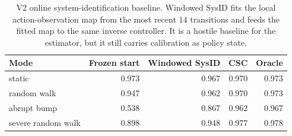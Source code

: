 \begin{table}[t]
\caption{V2 online system-identification baseline. Windowed SysID fits the local action-observation map from the most recent 14 transitions and feeds the fitted map to the same inverse controller. It is a hostile baseline for the estimator, but it still carries calibration as policy state.}
\label{tab:windowed-sysid}
\centering
\begin{tabular}{lrrrr}
\toprule
Mode & Frozen start & Windowed SysID & CSC & Oracle \\
\midrule
static & 0.973 & 0.967 & 0.970 & 0.973 \\
random walk & 0.947 & 0.962 & 0.970 & 0.973 \\
abrupt bump & 0.538 & 0.867 & 0.962 & 0.967 \\
severe random walk & 0.898 & 0.948 & 0.977 & 0.978 \\
\bottomrule
\end{tabular}
\end{table}
